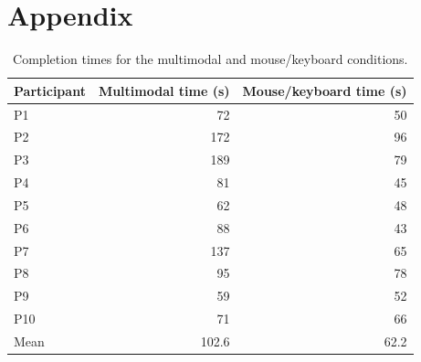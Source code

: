 \documentclass[sigconf]{acmart}
\begin{document}




\clearpage
\onecolumn
\appendix
\section{Appendix}

\begin{table}[h]
  \centering
  \caption{Completion times for the multimodal and mouse/keyboard conditions.}
  \label{tab:completion-times}
  \begin{tabular}{lrr}
    \toprule
    Participant & Multimodal time (s) & Mouse/keyboard time (s) \\
    \midrule
    P1  & 72  & 50 \\
    P2  & 172 & 96 \\
    P3  & 189 & 79 \\
    P4  & 81  & 45 \\
    P5  & 62  & 48 \\
    P6  & 88  & 43 \\
    P7  & 137 & 65 \\
    P8  & 95  & 78 \\
    P9  & 59  & 52 \\
    P10 & 71  & 66 \\
    \midrule
    Mean & 102.6 & 62.2 \\
    \bottomrule
  \end{tabular}
\end{table}
\end{document}
